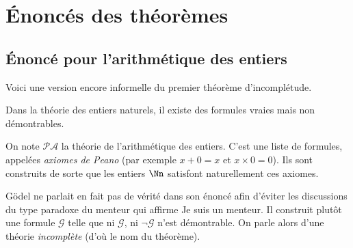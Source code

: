 \documentclass[11pt,class=report,crop=false]{standalone}
\begin{document}








\section{Énoncés des théorèmes}

\subsection{Énoncé pour l'arithmétique des entiers}

Voici une version encore informelle du premier théorème d'incomplétude.

\begin{theoreme}
Dans la théorie des entiers naturels, il existe des formules vraies mais non démontrables.
\end{theoreme}

On note $\mathcal{PA}$ la théorie de l'arithmétique des entiers. C'est une liste de formules, appelées \emph{axiomes de Peano} (par exemple \og{}$x+0=x$\fg{} et \og{}$x \times 0 = 0$\fg{}). Ils sont construits de sorte que les entiers $\Nn$ satisfont naturellement ces axiomes.

Gödel ne parlait en fait pas de vérité dans son énoncé afin d'éviter les discussions du type paradoxe du menteur qui affirme \og{}Je suis un menteur\fg{}. Il construit plutôt une formule $\mathcal{G}$ telle que ni $\mathcal{G}$, ni $\lnot\mathcal{G}$ n'est démontrable. On parle alors d'une théorie \emph{incomplète} (d'où le nom du théorème).
    
\end{document}
